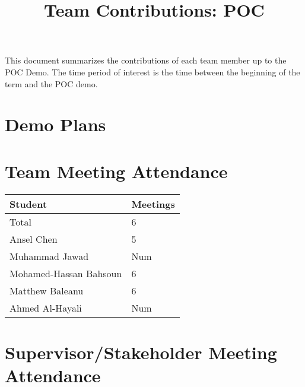 \documentclass{article}
\title{Team Contributions: POC\\\progname}
\author{\authname}
\date{}
\begin{document}
\maketitle

This document summarizes the contributions of each team member up to the POC
Demo.  The time period of interest is the time between the beginning of the term
and the POC demo.

\section{Demo Plans}


\section{Team Meeting Attendance}


\begin{table}[H]
\centering
\begin{tabular}{ll}
\toprule
\textbf{Student} & \textbf{Meetings}\\
\midrule
Total & 6\\
Ansel Chen & 5\\
Muhammad Jawad & Num\\
Mohamed-Hassan Bahsoun & 6\\
Matthew Baleanu & 6\\
Ahmed Al-Hayali & Num\\
\bottomrule
\end{tabular}
\end{table}


\section{Supervisor/Stakeholder Meeting Attendance}

\end{document}
